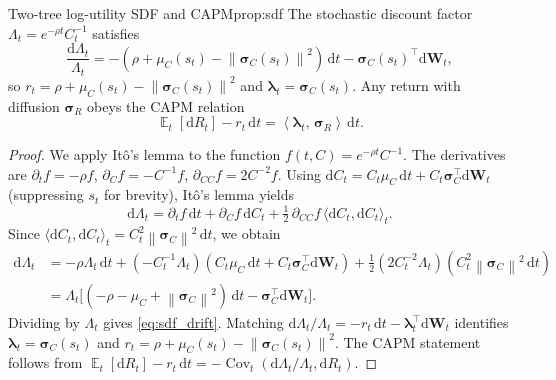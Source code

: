 ﻿\documentclass[11pt,letterpaper,oneside]{article}
\numberwithin{equation}{section}
\DeclareMathOperator{\E}{\mathbb{E}}
\DeclareMathOperator{\Cov}{\mathrm{Cov}}
\newcommand{\1}{\mathbf{1}}
\newcommand{\diff}{\mathrm{d}}
\newcommand{\norm}[1]{\left\lVert #1\right\rVert}
\newcommand{\ip}[2]{\left\langle #1,\,#2\right\rangle}
\begin{document}
\begin{proposition}{Two-tree log-utility SDF and CAPM}{prop:sdf}
The stochastic discount factor $\Lambda_t=e^{-\rho t}C_t^{-1}$ satisfies
\begin{equation}\label{eq:sdf_drift}
  \frac{\diff \Lambda_t}{\Lambda_t}=-(\rho+\mu_C(s_t)-\norm{\bm{\sigma}_C(s_t)}^2)\,\diff t-\bm{\sigma}_C(s_t)^{\top}\diff \bm{W}_t,
\end{equation}
so $r_t=\rho+\mu_C(s_t)-\norm{\bm{\sigma}_C(s_t)}^2$ and $\bm{\lambda}_t=\bm{\sigma}_C(s_t)$. Any return with diffusion $\bm{\sigma}_R$ obeys the CAPM relation
\begin{equation}\label{eq:capm}
  \E_t[\diff R_t]-r_t\,\diff t=\ip{\bm{\lambda}_t}{\bm{\sigma}_R}\,\diff t.
\end{equation}
\end{proposition}
\begin{proof}
We apply It\^o's lemma to the function $f(t, C) = e^{-\rho t} C^{-1}$. The derivatives are $\partial_t f = -\rho f$, $\partial_C f = -C^{-1} f$, $\partial_{CC} f = 2C^{-2} f$. Using $\diff C_t = C_t\mu_C\,\diff t + C_t\bm{\sigma}_C^{\top}\diff\bm{W}_t$ (suppressing $s_t$ for brevity), It\^o's lemma yields
\[
  \diff\Lambda_t = \partial_t f\,\diff t + \partial_C f\,\diff C_t + \tfrac12\,\partial_{CC} f\,\langle\diff C_t,\diff C_t\rangle_t.
\]
Since $\langle\diff C_t,\diff C_t\rangle_t = C_t^2\norm{\bm{\sigma}_C}^2\,\diff t$, we obtain
\begin{align*}
  \diff\Lambda_t
  &= -\rho\Lambda_t\,\diff t + (-C_t^{-1}\Lambda_t)(C_t\mu_C\,\diff t + C_t\bm{\sigma}_C^{\top}\diff\bm{W}_t) + \tfrac12(2 C_t^{-2}\Lambda_t)(C_t^2\norm{\bm{\sigma}_C}^2\,\diff t) \\
  &= \Lambda_t\Big[(-\rho-\mu_C+\norm{\bm{\sigma}_C}^2)\,\diff t - \bm{\sigma}_C^{\top}\diff\bm{W}_t\Big].
\end{align*}
Dividing by $\Lambda_t$ gives \cref{eq:sdf_drift}. Matching $\diff\Lambda_t/\Lambda_t = -r_t\,\diff t - \bm{\lambda}_t^{\top}\diff\bm{W}_t$ identifies $\bm{\lambda}_t=\bm{\sigma}_C(s_t)$ and $r_t=\rho+\mu_C(s_t)-\norm{\bm{\sigma}_C(s_t)}^2$. The CAPM statement follows from $\E_t[\diff R_t]-r_t\,\diff t=-\Cov_t(\diff\Lambda_t/\Lambda_t,\diff R_t)$.
\end{proof}
\end{document}
